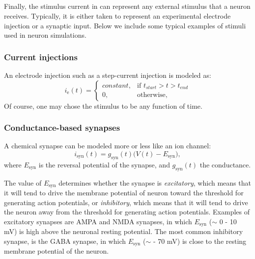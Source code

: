 \subsection{}
\label{sec:Neuron:stim}
Finally, the stimulus current in  can represent any external stimulus that a neuron receives. Typically, it is either taken to represent an experimental electrode injection or a synaptic input. Below we include some typical examples of stimuli used in neuron simulations. 

\subsubsection{Current injections}
An electrode injection such as a step-current injection is modeled as:
\begin{equation}
i_\text{e}(t)= 
\begin{cases}
    constant, & \text{if } t_{start} > t > t_{end} \\
    0,              & \text{otherwise},
\end{cases}
\label{eq:Neuron:injected}
\end{equation}
Of course, one may chose the stimulus to be any function of time.


\subsubsection{Conductance-based synapses}
A chemical synapse can be modeled more or less like an ion channel:
\begin{equation}
i_\text{syn}(t) = g_\text{syn}(t) \big(V(t)-E_\text{syn} \big), 
\label{eq:Neuron:chemicalsynapse}
\end{equation}
where $E_\text{syn}$ is the reversal potential of the synapse, and $g_\text{syn}(t)$ the conductance. 

The value of $E_\text{syn}$ determines whether the synapse is \textit{excitatory}, which means that it will tend to drive the  membrane potential of neuron toward the threshold for generating action potentials, or \textit{inhibitory}, which means that it will tend to drive the neuron away from the threshold for generating action potentials. Examples of excitatory synapses are AMPA and NMDA synapses, in which $E_\text{syn}$ ($\sim$ 0 - 10 mV) is high above the neuronal resting potential. The most common inhibitory synapse, is the GABA synapse, in which $E_\text{syn}$ ($\sim$ - 70 mV) is close to the resting membrane potential of the neuron.

